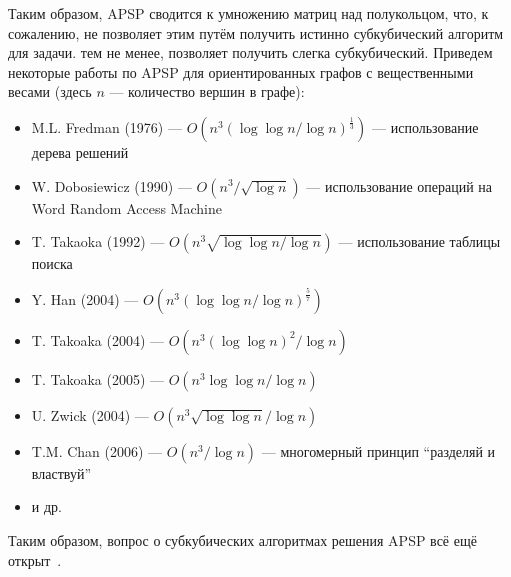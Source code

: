 Таким образом, APSP сводится к умножению матриц над полукольцом, что, к сожалению, не позволяет этим путём получить истинно субкубический алгоритм для задачи. тем не менее, позволяет получить слегка субкубический. Приведем некоторые работы по APSP для ориентированных графов с вещественными весами (здесь $n$ --- количество вершин в графе):
\begin{itemize}
    \item M.L. Fredman (1976) --- $O(n^3(\log \log n / \log n)^\frac{1}{3})$ --- использование дерева решений~\cite{FredmanAPSP1976}
    \item W. Dobosiewicz (1990) --- $O(n^3 / \sqrt{\log n})$ --- использование операций на Word Random Access Machine~\cite{Dobosiewicz1990}
    \item T. Takaoka (1992) --- $O(n^3 \sqrt{\log \log n / \log n})$ --- использование таблицы поиска~\cite{Takaoka1992}
    \item Y. Han (2004) --- $O(n^3 (\log \log n / \log n)^\frac{5}{7})$~\cite{Han2004}
    \item T. Takoaka (2004) --- $O(n^3 (\log \log n)^2 / \log n)$~\cite{Takaoka2004}
    \item T. Takoaka (2005) --- $O(n^3 \log \log n / \log n)$~\cite{Takaoka2005}
    \item U. Zwick (2004) --- $O(n^3 \sqrt{\log \log n} / \log n)$~\cite{Zwick2004}
    \item T.M. Chan (2006) --- $O(n^3 / \log n)$ --- многомерный принцип ``разделяй и властвуй''~\cite{Chan2008}
    \item и др.
\end{itemize}

Таким образом, вопрос о субкубических алгоритмах решения APSP всё ещё открыт~\cite{Chan2010}.




